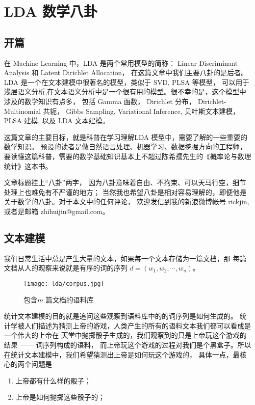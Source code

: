 %
\chapter{LDA 数学八卦}
\section{开篇}

在 Machine Learning 中，LDA 是两个常用模型的简称： Linear Discriminant Analysis 和 Latent Dirichlet Allocation，
在这篇文章中我们主要八卦的是后者。LDA 是一个在文本建模中很著名的模型，类似于 SVD, PLSA 等模型， 可以用于浅层语义分析,在文本语义分析中是一个很有用的模型。很不幸的是，这个模型中涉及的数学知识有点多，
包括 Gamma 函数， Dirichlet 分布， Dirichlet-Multinomial 共轭， Gibbs Sampling,
Variational Inference, 贝叶斯文本建模，PLSA 建模, 以及 LDA 文本建模。

这篇文章的主要目标，就是科普在学习理解LDA 模型中，需要了解的一些重要的数学知识。
预设的读者是做自然语言处理、机器学习、数据挖掘方向的工程师，
要读懂这篇科普，需要的数学基础知识基本上不超过陈希孺先生的《概率论与数理统计》这本书。

文章标题挂上“八卦”两字， 因为八卦意味着自由、不拘束、可以天马行空，细节处理上也难免有不严谨的地方；
当然我也希望八卦是相对容易理解的，即便他是关于数学的八卦。对于本文中的任何评论，
欢迎发信到我的新浪微博帐号 rickjin, 或者是邮箱 zhihuijin@gmail.com。


\section{文本建模}

我们日常生活中总是产生大量的文本，如果每一个文本存储为一篇文档，那
每篇文档从人的观察来说就是有序的词的序列 $d=(w_1, w_2, \cdots, w_n)$。

\begin{figure}[htbp]
\centering
\texttt{[image: lda/corpus.jpg]}
\caption{包含$m$ 篇文档的语料库}
\end{figure}

统计文本建模的目的就是追问这些观察到语料库中的的词序列是如何生成的。
统计学被人们描述为猜测上帝的游戏，人类产生的所有的语料文本我们都可以看成是一个伟大的上帝在
天堂中抛掷骰子生成的，我们观察到的只是上帝玩这个游戏的结果 ------ 词序列构成的语料，
而上帝玩这个游戏的过程对我们是个黑盒子。所以在统计文本建模中，我们希望猜测出上帝是如何玩这个游戏的，
具体一点，最核心的两个问题是
\begin{enumerate}
\item 上帝都有什么样的骰子；
\item 上帝是如何抛掷这些骰子的；
\end{enumerate}


